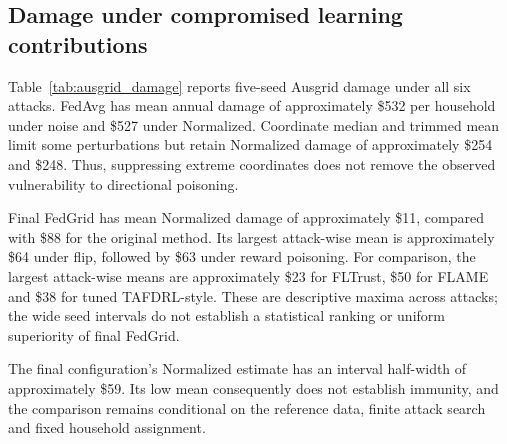 \documentclass[preprint,12pt,a4paper]{elsarticle}
\begin{document}
\subsection{Damage under compromised learning contributions}
Table~\ref{tab:ausgrid_damage} reports five-seed Ausgrid damage under all six attacks. FedAvg has mean annual damage of approximately \$532 per household under noise and \$527 under Normalized. Coordinate median and trimmed mean limit some perturbations but retain Normalized damage of approximately \$254 and \$248. Thus, suppressing extreme coordinates does not remove the observed vulnerability to directional poisoning.

Final FedGrid has mean Normalized damage of approximately \$11, compared with \$88 for the original method. Its largest attack-wise mean is approximately \$64 under flip, followed by \$63 under reward poisoning. For comparison, the largest attack-wise means are approximately \$23 for FLTrust, \$50 for FLAME and \$38 for tuned TAFDRL-style. These are descriptive maxima across attacks; the wide seed intervals do not establish a statistical ranking or uniform superiority of final FedGrid.

The final configuration's Normalized estimate has an interval half-width of approximately \$59. Its low mean consequently does not establish immunity, and the comparison remains conditional on the reference data, finite attack search and fixed household assignment.
\end{document}
